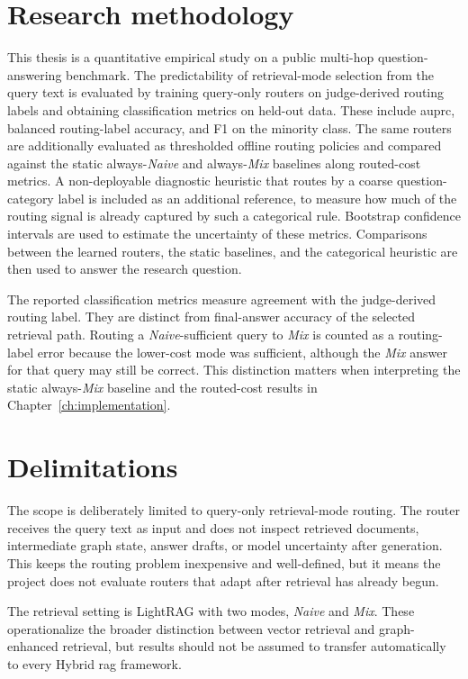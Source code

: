 \documentclass[english, bibtex]{kththesis}               %
\numberwithin{listing}{chapter}
\begin{document}
\section{Research methodology}
\label{sec:researchMethodology}

This thesis is a quantitative empirical study on a public multi-hop question-answering benchmark. The predictability of retrieval-mode selection from the query text is evaluated by training query-only routers on judge-derived routing labels and obtaining classification metrics on held-out data. These include \gls{auprc}, balanced routing-label accuracy, and F1 on the minority class. The same routers are additionally evaluated as thresholded offline routing policies and compared against the static always-\emph{Naive} and always-\emph{Mix} baselines along routed-cost metrics. A non-deployable diagnostic heuristic that routes by a coarse question-category label is included as an additional reference, to measure how much of the routing signal is already captured by such a categorical rule. Bootstrap confidence intervals are used to estimate the uncertainty of these metrics. Comparisons between the learned routers, the static baselines, and the categorical heuristic are then used to answer the research question.

The reported classification metrics measure agreement with the judge-derived routing label. They are distinct from final-answer accuracy of the selected retrieval path. Routing a \emph{Naive}-sufficient query to \emph{Mix} is counted as a routing-label error because the lower-cost mode was sufficient, although the \emph{Mix} answer for that query may still be correct. This distinction matters when interpreting the static always-\emph{Mix} baseline and the routed-cost results in Chapter~\ref{ch:implementation}.

\section{Delimitations}
\label{sec:delimitations}

The scope is deliberately limited to query-only retrieval-mode routing. The router receives the query text as input and does not inspect retrieved documents, intermediate graph state, answer drafts, or model uncertainty after generation. This keeps the routing problem inexpensive and well-defined, but it means the project does not evaluate routers that adapt after retrieval has already begun.

The retrieval setting is LightRAG with two modes, \emph{Naive} and \emph{Mix}. These operationalize the broader distinction between vector retrieval and graph-enhanced retrieval, but results should not be assumed to transfer automatically to every Hybrid \gls{rag} framework.
\end{document}
